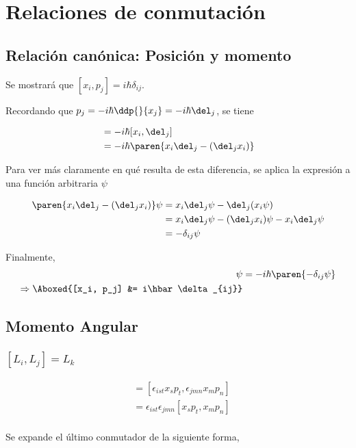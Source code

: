 \section{Relaciones de conmutación}
\subsection{Relación canónica: Posición y momento}
Se mostrará que $[x_i,p_j] = i\hbar\delta_{ij}$.

Recordando que $p_j = -i \hbar \ddp{}{x_j} = -i\hbar \del_j$, se tiene

\begin{align}
	[x_i, p_j] &= -i\hbar [x_i, \del_j] \\
			&= -i\hbar \paren{x_i \del_j - (\del_jx_i)}
\end{align}

Para ver más claramente en qué resulta de esta diferencia, se aplica la expresión a una función arbitraria $\psi$  

\begin{align}
	\paren{x_i \del_j - (\del_jx_i)}\psi &= x_i \del_j\psi - \del_j(x_i \psi) \\
		&= x_i \del_j\psi - (\del_j x_i) \psi - x_i \del_j \psi \\
		&= -\delta_{ij}\psi
\end{align}

Finalmente, 
\begin{align}
	[x_i, p_j]\psi &= -i\hbar\paren{-\delta_{ij}\psi} \\
	\Rightarrow \Aboxed{[x_i, p_j] &= i\hbar\delta_{ij}}
\end{align}

\subsection{Momento Angular}
\subsubsection{$[L_i,L_j] = L_k$}


\begin{align}
	[L_i,L_j] &= [ \epsilon_{ist}x_s p_t , \epsilon_{jmn}x_m p_n ] \\
		&= \epsilon_{ist}\epsilon_{jmn}[ x_s p_t , x_m p_n ] \\
\end{align}

Se expande el último conmutador de la siguiente forma, 


